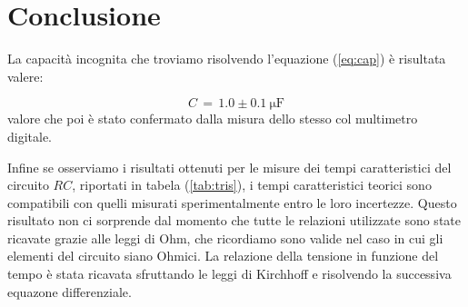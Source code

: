 \section*{Conclusione}

La capacità incognita che troviamo risolvendo l'equazione (\ref{eq:cap}) è risultata valere:

\begin{equation}
  C \,=\, 1.0 \pm 0.1 \: \si{\micro\farad}
\end{equation}
%
valore che poi è stato confermato dalla misura dello stesso col multimetro digitale.

Infine se osserviamo i risultati ottenuti per le misure dei tempi caratteristici del circuito $RC$, riportati in tabela (\ref{tab:tris}), i tempi caratteristici teorici sono compatibili con quelli misurati sperimentalmente entro le loro incertezze.
Questo risultato non ci sorprende dal momento che tutte le relazioni utilizzate sono state ricavate grazie alle leggi di Ohm, che ricordiamo sono valide nel caso in cui gli elementi del circuito siano Ohmici. La relazione della tensione in funzione del tempo è stata ricavata sfruttando le leggi di Kirchhoff e risolvendo la successiva equazone differenziale.